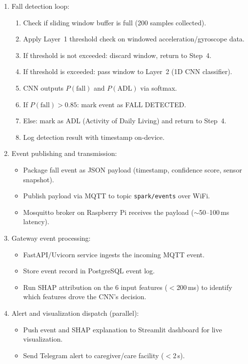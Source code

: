 \begin{enumerate}
    \item Fall detection loop:
    \begin{enumerate}
        \item Check if sliding window buffer is full (200 samples collected).
        \item Apply Layer~1 threshold check on windowed acceleration/gyroscope data.
        \item If threshold is not exceeded: discard window, return to Step~4.
        \item If threshold is exceeded: pass window to Layer~2 (1D CNN classifier).
        \item CNN outputs $P(\text{fall})$ and $P(\text{ADL})$ via softmax.
        \item If $P(\text{fall}) > 0.85$: mark event as FALL DETECTED.
        \item Else: mark as ADL (Activity of Daily Living) and return to Step~4.
        \item Log detection result with timestamp on-device.
    \end{enumerate}

    \item Event publishing and transmission:
    \begin{itemize}
        \item Package fall event as JSON payload (timestamp, confidence score, sensor snapshot).
        \item Publish payload via MQTT to topic \texttt{spark/events} over WiFi.
        \item Mosquitto broker on Raspberry Pi receives the payload ($\sim$50--100\,ms latency).
    \end{itemize}

    \item Gateway event processing:
    \begin{itemize}
        \item FastAPI/Uvicorn service ingests the incoming MQTT event.
        \item Store event record in PostgreSQL event log.
        \item Run SHAP attribution on the 6 input features ($<$200\,ms) to identify which features drove the CNN's decision.
    \end{itemize}

    \item Alert and visualization dispatch (parallel):
    \begin{itemize}
        \item Push event and SHAP explanation to Streamlit dashboard for live visualization.
        \item Send Telegram alert to caregiver/care facility ($<$2\,s).
    \end{itemize}


\end{enumerate}

